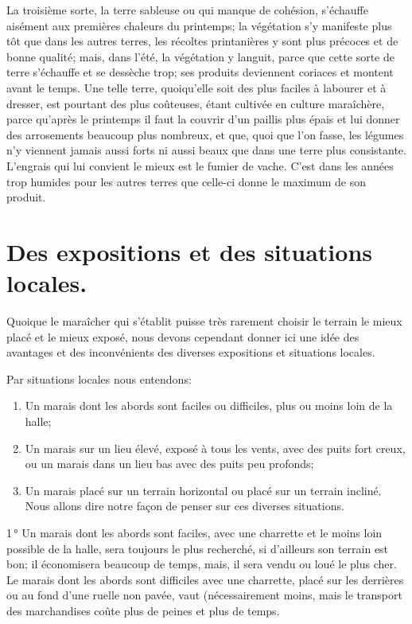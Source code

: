 \documentclass[10pt,a4paper]{book}
\begin{document}
La troisième sorte, la terre sableuse ou qui manque de cohésion, s'échauffe aisément aux premières chaleurs du printemps; la végétation s'y manifeste plus tôt que dans les autres terres, les récoltes printanières y sont plus précoces et de bonne qualité; mais, dans l'été, la végétation y languit, parce que cette sorte de terre s'échauffe et se dessèche trop; ses produits deviennent coriaces et montent avant le temps. Une telle terre, quoiqu'elle soit des plus faciles à labourer et à dresser, est pourtant des plus coûteuses, étant cultivée en culture maraîchère, parce qu'après le printemps il faut la couvrir d'un paillis plus épais et lui donner des arrosements beaucoup plus nombreux, et que, quoi que l'on fasse, les légumes n'y viennent jamais aussi forts ni aussi beaux que dans une terre plus consistante. L'engrais qui lui convient le mieux est le fumier de vache. C'est dans les années trop humides pour les autres terres que celle-ci donne le maximum de son produit.

\chapter{Des expositions et des situations locales.}

Quoique le maraîcher qui s'établit puisse très rarement choisir le terrain le mieux placé et le mieux exposé, nous devons cependant donner ici une idée des avantages et des inconvénients des diverses expositions et situations locales.

Par situations locales nous entendons:
\begin{enumerate}
\item Un marais dont les abords sont faciles ou difficiles, plus ou moins loin de la halle;
\item Un marais sur un lieu élevé, exposé à tous les vents, avec des puits fort creux, ou un marais dans un lieu bas avec des puits peu profonds;
\item Un marais placé sur un terrain horizontal ou placé sur un terrain incliné. Nous allons dire notre façon de penser sur ces diverses situations.
\end{enumerate}

1\,° Un marais dont les abords sont faciles, avec une charrette et le moins loin possible de la halle, sera toujours le plus recherché, si d'ailleurs son terrain est bon; il économisera beaucoup de temps, mais, il sera vendu ou loué le plus cher. Le marais dont les abords sont difficiles avec une charrette, placé sur les derrières ou au fond d'une ruelle non pavée, vaut (nécessairement moins, mais le transport des marchandises coûte plus de peines et plus de temps.
\end{document}
